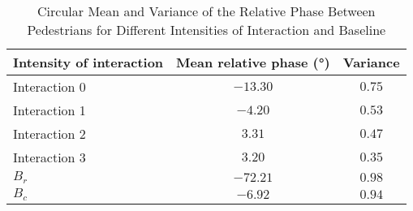 \begin{table}[!t]
\caption{Circular Mean and Variance of the Relative Phase Between Pedestrians for Different Intensities of Interaction and Baseline\label{tab:relative_phase}}
\centering
\begin{tabular}{lcc}
\toprule
Intensity of interaction & Mean relative phase (°) & Variance \\
\midrule
Interaction 0 & $-13.30$ & $0.75$ \\
Interaction 1 & $-4.20$ & $0.53$ \\
Interaction 2 & $3.31$ & $0.47$ \\
Interaction 3 & $3.20$ & $0.35$ \\
\midrule
$B_r$ & $-72.21$ & $0.98$ \\
$B_c$ & $-6.92$ & $0.94$ \\
\bottomrule
\end{tabular}
\end{table}
